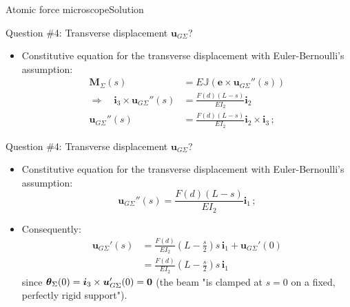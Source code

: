 \documentclass{beamer}
\newcommand{\imply}{\Rightarrow}
\newcommand{\uj}{u}
\newcommand{\uv}{{\boldsymbol\uj}}
\newcommand{\ej}{e}
\renewcommand{\ij}{i}
\newcommand{\ev}{{\boldsymbol\ej}}
\newcommand{\iv}{{\boldsymbol\ij}}
\newcommand*{\drotj}{\theta}
\newcommand*{\drot}{{\boldsymbol\drotj}}
\newcommand*{\Mstaticj}{J}
\newcommand*{\Mstatic}{{\mathbb\Mstaticj}}
\newcommand{\Mresj}{M}
\newcommand{\Mres}{{\boldsymbol\Mresj}}
\newcommand{\bzero}{{\bf 0}}
\begin{document}
\begin{frame}{Atomic force microscope}{Solution}

\begin{overprint}

\vskip-20pt
\begin{exampleblock}{Question \#4: Transverse displacement $\uv_{G\Sigma}$?}
\begin{itemize}
\item Constitutive equation for the transverse displacement with Euler-Bernoulli's assumption:
\begin{displaymath}
\begin{split}
\Mres_\Sigma(s) &=E\Mstatic(\ev\times\uv_{G\Sigma}''(s)) \\
\imply\quad\iv_3\times\uv_{G\Sigma}''(s) &=\frac{F(d)(L-s)}{EI_2}\iv_2 \\
\uv_{G\Sigma}''(s) &=\frac{F(d)(L-s)}{EI_2}\iv_2\times\iv_3\,;
\end{split}
\end{displaymath}
\end{itemize}
\end{exampleblock}

\vskip-20pt
\begin{exampleblock}{Question \#4: Transverse displacement $\uv_{G\Sigma}$?}
\begin{itemize}
\item Constitutive equation for the transverse displacement with Euler-Bernoulli's assumption:
\begin{displaymath}
\uv_{G\Sigma}''(s)=\frac{F(d)(L-s)}{EI_2}\iv_1\,;
\end{displaymath}
\item Consequently:
\begin{displaymath}
\begin{split}
\uv_{G\Sigma}'(s) &= \frac{F(d)}{EI_2}\left(L-\frac{s}{2}\right)s\,\iv_1+\uv_{G\Sigma}'(0) \\
&= \frac{F(d)}{EI_2}\left(L-\frac{s}{2}\right)s\,\iv_1
\end{split}
\end{displaymath}
since $\drot_\Sigma(0)=\iv_3\times\uv_{G\Sigma}'(0)=\bzero$ (the beam "is clamped at $s=0$ on a fixed, perfectly rigid support").
\end{itemize}
\end{exampleblock}


\end{overprint}
\end{frame}
\end{document}

